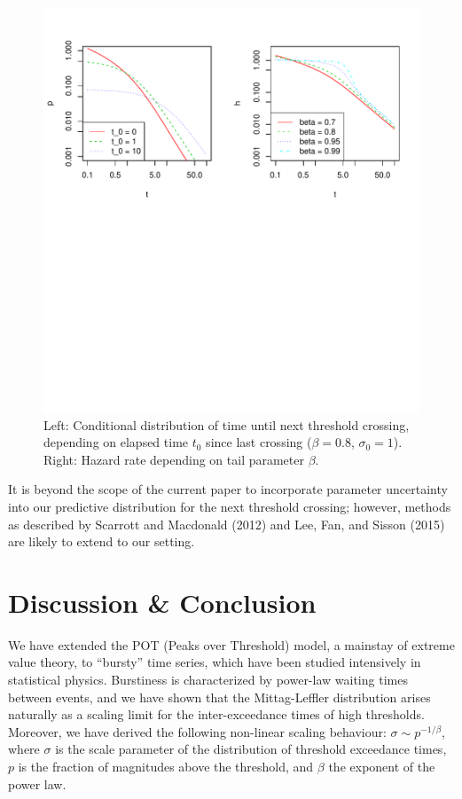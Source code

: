\documentclass[smallextended]{svjour3}       %
\begin{document}
\begin{figure}
\includegraphics[width=\textwidth]{article_springer_files/figure-latex/hazard-1} \caption{Left: Conditional distribution of time until next threshold crossing, depending on elapsed time $t_0$ since last crossing ($\beta = 0.8$, $\sigma_0 = 1$). Right: Hazard rate depending on tail parameter $\beta$.\label{fig:hazard}}\label{fig:hazard}
\end{figure}

It is beyond the scope of the current paper to incorporate parameter
uncertainty into our predictive distribution for the next threshold
crossing; however, methods as described by Scarrott and Macdonald (2012)
and Lee, Fan, and Sisson (2015) are likely to extend to our setting.

\section{Discussion \& Conclusion}\label{discussion-conclusion}

We have extended the POT (Peaks over Threshold) model, a mainstay of
extreme value theory, to ``bursty'' time series, which have been studied
intensively in statistical physics. Burstiness is characterized by
power-law waiting times between events, and we have shown that the
Mittag-Leffler distribution arises naturally as a scaling limit for the
inter-exceedance times of high thresholds. Moreover, we have derived the
following non-linear scaling behaviour: \(\sigma \sim p^{-1/\beta}\),
where \(\sigma\) is the scale parameter of the distribution of threshold
exceedance times, \(p\) is the fraction of magnitudes above the
threshold, and \(\beta\) the exponent of the power law.
\end{document}
